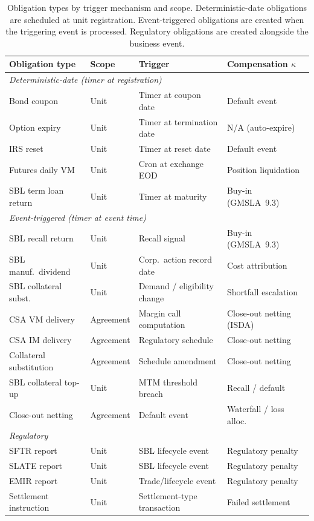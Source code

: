 \documentclass[11pt,a4paper]{article}
\begin{document}
\begin{table}[ht]
\centering
\small
\begin{tabular}{l l l l}
\toprule
\textbf{Obligation type} & \textbf{Scope} & \textbf{Trigger} & \textbf{Compensation $\kappa$} \\
\midrule
\multicolumn{4}{l}{\textit{Deterministic-date (timer at registration)}} \\
Bond coupon & Unit & Timer at coupon date & Default event \\
Option expiry & Unit & Timer at termination date & N/A (auto-expire) \\
IRS reset & Unit & Timer at reset date & Default event \\
Futures daily VM & Unit & Cron at exchange EOD & Position liquidation \\
SBL term loan return & Unit & Timer at maturity & Buy-in (GMSLA~9.3) \\
\midrule
\multicolumn{4}{l}{\textit{Event-triggered (timer at event time)}} \\
SBL recall return & Unit & Recall signal & Buy-in (GMSLA~9.3) \\
SBL manuf.\ dividend & Unit & Corp.\ action record date & Cost attribution \\
SBL collateral subst. & Unit & Demand / eligibility change & Shortfall escalation \\
CSA VM delivery & Agreement & Margin call computation & Close-out netting (ISDA) \\
CSA IM delivery & Agreement & Regulatory schedule & Close-out netting \\
Collateral substitution & Agreement & Schedule amendment & Close-out netting \\
SBL collateral top-up & Unit & MTM threshold breach & Recall / default \\
Close-out netting & Agreement & Default event & Waterfall / loss alloc. \\
\midrule
\multicolumn{4}{l}{\textit{Regulatory}} \\
SFTR report & Unit & SBL lifecycle event & Regulatory penalty \\
SLATE report & Unit & SBL lifecycle event & Regulatory penalty \\
EMIR report & Unit & Trade/lifecycle event & Regulatory penalty \\
Settlement instruction & Unit & Settlement-type transaction & Failed settlement \\
\bottomrule
\end{tabular}
\caption{Obligation types by trigger mechanism and scope. Deterministic-date obligations are scheduled at unit registration. Event-triggered obligations are created when the triggering event is processed. Regulatory obligations are created alongside the business event.}
\label{tab:obligation-types}
\end{table}
\end{document}
